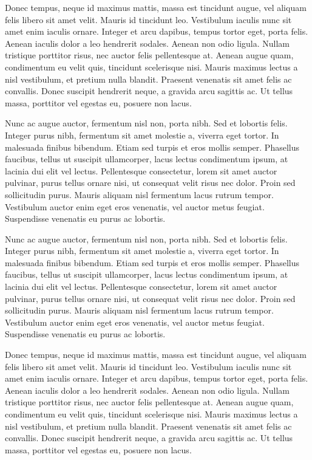 \documentclass[twocolumn,superscriptaddress,aps]{revtex4-1}
\begin{document}
Donec tempus, neque id maximus mattis, massa est tincidunt augue, vel aliquam felis libero sit amet velit. Mauris id tincidunt leo. Vestibulum iaculis nunc sit amet enim iaculis ornare. Integer et arcu dapibus, tempus tortor eget, porta felis. Aenean iaculis dolor a leo hendrerit sodales. Aenean non odio ligula. Nullam tristique porttitor risus, nec auctor felis pellentesque at. Aenean augue quam, condimentum eu velit quis, tincidunt scelerisque nisi. Mauris maximus lectus a nisl vestibulum, et pretium nulla blandit. Praesent venenatis sit amet felis ac convallis. Donec suscipit hendrerit neque, a gravida arcu sagittis ac. Ut tellus massa, porttitor vel egestas eu, posuere non lacus.

Nunc ac augue auctor, fermentum nisl non, porta nibh. Sed et lobortis felis. Integer purus nibh, fermentum sit amet molestie a, viverra eget tortor. In malesuada finibus bibendum. Etiam sed turpis et eros mollis semper. Phasellus faucibus, tellus ut suscipit ullamcorper, lacus lectus condimentum ipsum, at lacinia dui elit vel lectus. Pellentesque consectetur, lorem sit amet auctor pulvinar, purus tellus ornare nisi, ut consequat velit risus nec dolor. Proin sed sollicitudin purus. Mauris aliquam nisl fermentum lacus rutrum tempor. Vestibulum auctor enim eget eros venenatis, vel auctor metus feugiat. Suspendisse venenatis eu purus ac lobortis.

Nunc ac augue auctor, fermentum nisl non, porta nibh. Sed et lobortis felis. Integer purus nibh, fermentum sit amet molestie a, viverra eget tortor. In malesuada finibus bibendum. Etiam sed turpis et eros mollis semper. Phasellus faucibus, tellus ut suscipit ullamcorper, lacus lectus condimentum ipsum, at lacinia dui elit vel lectus. Pellentesque consectetur, lorem sit amet auctor pulvinar, purus tellus ornare nisi, ut consequat velit risus nec dolor. Proin sed sollicitudin purus. Mauris aliquam nisl fermentum lacus rutrum tempor. Vestibulum auctor enim eget eros venenatis, vel auctor metus feugiat. Suspendisse venenatis eu purus ac lobortis.

Donec tempus, neque id maximus mattis, massa est tincidunt augue, vel aliquam felis libero sit amet velit. Mauris id tincidunt leo. Vestibulum iaculis nunc sit amet enim iaculis ornare. Integer et arcu dapibus, tempus tortor eget, porta felis. Aenean iaculis dolor a leo hendrerit sodales. Aenean non odio ligula. Nullam tristique porttitor risus, nec auctor felis pellentesque at. Aenean augue quam, condimentum eu velit quis, tincidunt scelerisque nisi. Mauris maximus lectus a nisl vestibulum, et pretium nulla blandit. Praesent venenatis sit amet felis ac convallis. Donec suscipit hendrerit neque, a gravida arcu sagittis ac. Ut tellus massa, porttitor vel egestas eu, posuere non lacus.
\end{document}
